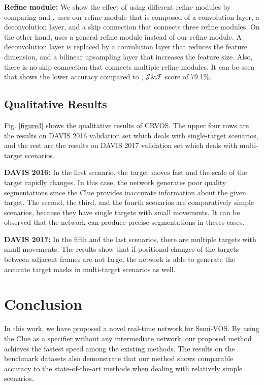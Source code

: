 \documentclass{article}
\begin{document}
\vspace{1mm}
\noindent\textbf{Refine module:} We show the effect of using different refine modules by comparing  and .  uses our refine module that is composed of a convolution layer, a deconvolution layer, and a skip connection that connects three refine modules. On the other hand,  uses a general refine module instead of our refine module. A deconvolution layer is replaced by a convolution layer that reduces the feature dimension, and a bilinear upsampling layer that increases the feature size. Also, there is no skip connection that connects multiple refine modules. It can be seen that  shows the lower accuracy compared to , $\mathcal{J}\&\mathcal{F}$ score of 79.1\%.


\subsection{Qualitative Results} \label{qualitative results}
Fig. \ref{figure3} shows the qualitative results of CRVOS. The upper four rows are the results on DAVIS 2016 \cite{perazzi2016benchmark} validation set which deals with single-target scenarios, and the rest are the results on DAVIS 2017 \cite{pont20172017} validation set which deals with multi-target scenarios.


\vspace{1mm}
\noindent\textbf{DAVIS 2016:} In the first scenario, the target moves fast and the scale of the target rapidly changes. In this case, the network generates poor quality segmentations since the Clue provides inaccurate information about the given target. The second, the third, and the fourth scenarios are comparatively simple scenarios, because they have single targets with small movements. It can be observed that the network can produce precise segmentations in theses cases.


\vspace{1mm}
\noindent\textbf{DAVIS 2017:} In the fifth and the last scenarios, there are multiple targets with small movements. The results show that if positional changes of the targets between adjacent frames are not large, the network is able to generate the accurate target masks in multi-target scenarios as well. 



\section{Conclusion}
In this work, we have proposed a novel real-time network for Semi-VOS. By using the Clue as a specifier without any intermediate network, our proposed method achieves the fastest speed among the existing methods. The results on the benchmark datasets also demonstrate that our method shows comparable accuracy to the state-of-the-art methods when dealing with relatively simple scenarios. 
\end{document}
